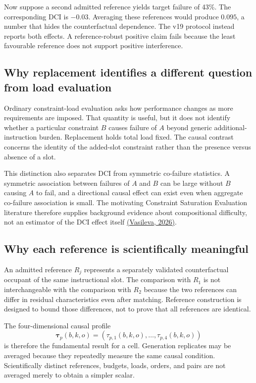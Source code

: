 \documentclass[11pt,a4paper]{article}
\begin{document}
Now suppose a second admitted reference yields target failure of 43\%. The corresponding DCI is $-0.03$. Averaging these references would produce $0.095$, a number that hides the counterfactual dependence. The v19 protocol instead reports both effects. A reference-robust positive claim fails because the least favourable reference does not support positive interference.

\subsection{Why replacement identifies a different question from load evaluation}

Ordinary constraint-load evaluation asks how performance changes as more requirements are imposed. That quantity is useful, but it does not identify whether a particular constraint $B$ causes failure of $A$ beyond generic additional-instruction burden. Replacement holds total load fixed. The causal contrast concerns the identity of the added-slot constraint rather than the presence versus absence of a slot.

This distinction also separates DCI from symmetric co-failure statistics. A symmetric association between failures of $A$ and $B$ can be large without $B$ causing $A$ to fail, and a directional causal effect can exist even when aggregate co-failure association is small. The motivating Constraint Saturation Evaluation literature therefore supplies background evidence about compositional difficulty, not an estimator of the DCI effect itself \href{https://openreview.net/forum?id=a6r2ECEVls}{(Vasileva, 2026)}.

\subsection{Why each reference is scientifically meaningful}

An admitted reference $R_j$ represents a separately validated counterfactual occupant of the same instructional slot. The comparison with $R_1$ is not interchangeable with the comparison with $R_2$ because the two references can differ in residual characteristics even after matching. Reference construction is designed to bound those differences, not to prove that all references are identical.

The four-dimensional causal profile
\[
\boldsymbol\tau_p(b,k,o)
=
\left(
\tau_{p,1}(b,k,o),\ldots,\tau_{p,4}(b,k,o)
\right)
\]
is therefore the fundamental result for a cell. Generation replicates may be averaged because they repeatedly measure the same causal condition. Scientifically distinct references, budgets, loads, orders, and pairs are not averaged merely to obtain a simpler scalar.
\end{document}
